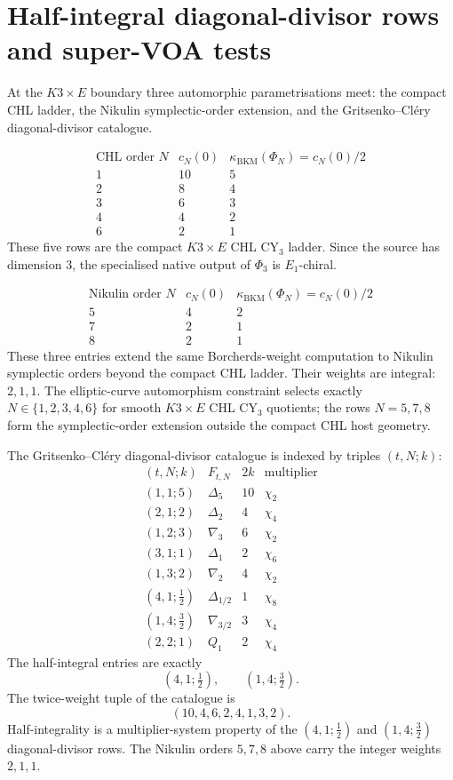 \providecommand{\kBKM}{\kappa_{\mathrm{BKM}}}
\providecommand{\kcat}{\kappa_{\mathrm{cat}}}
\providecommand{\kch}{\kappa_{\mathrm{ch}}}
\providecommand{\kfib}{\kappa_{\mathrm{fiber}}}
\providecommand{\Mp}{\mathrm{Mp}}
\providecommand{\Sp}{\mathrm{Sp}}

\section*{Half-integral diagonal-divisor rows and super-VOA tests}

At the \(K3\times E\) boundary three automorphic parametrisations meet:
the compact CHL ladder, the Nikulin symplectic-order extension, and the
Gritsenko--Cl\'ery diagonal-divisor catalogue.

\[
\begin{array}{c|c|c}
\text{CHL order }N & c_N(0) & \kBKM(\Phi_N)=c_N(0)/2 \\
\hline
1&10&5\\
2&8&4\\
3&6&3\\
4&4&2\\
6&2&1
\end{array}
\]
These five rows are the compact \(K3\times E\) CHL CY\(_3\) ladder.
Since the source has dimension \(3\), the specialised native output of
\(\Phi_3\) is \(E_1\)-chiral.

\[
\begin{array}{c|c|c}
\text{Nikulin order }N & c_N(0) & \kBKM(\Phi_N)=c_N(0)/2 \\
\hline
5&4&2\\
7&2&1\\
8&2&1
\end{array}
\]
These three entries extend the same Borcherds-weight computation to
Nikulin symplectic orders beyond the compact CHL ladder.  Their weights
are integral: \(2,1,1\).  The elliptic-curve automorphism constraint
selects exactly \(N\in\{1,2,3,4,6\}\) for smooth \(K3\times E\) CHL
CY\(_3\) quotients; the rows \(N=5,7,8\) form the symplectic-order
extension outside the compact CHL host geometry.

The Gritsenko--Cl\'ery diagonal-divisor catalogue is indexed by triples
\((t,N;k)\):
\[
\begin{array}{c|c|c|c}
(t,N;k) & F_{t,N} & 2k & \text{multiplier}\\
\hline
(1,1;5)&\Delta_5&10&\chi_2\\
(2,1;2)&\Delta_2&4&\chi_4\\
(1,2;3)&\nabla_3&6&\chi_2\\
(3,1;1)&\Delta_1&2&\chi_6\\
(1,3;2)&\nabla_2&4&\chi_2\\
(4,1;\tfrac12)&\Delta_{1/2}&1&\chi_8\\
(1,4;\tfrac32)&\nabla_{3/2}&3&\chi_4\\
(2,2;1)&Q_1&2&\chi_4
\end{array}
\]
The half-integral entries are exactly
\[
  (4,1;\tfrac12),\qquad (1,4;\tfrac32).
\]
The twice-weight tuple of the catalogue is
\[
  (10,4,6,2,4,1,3,2).
\]
Half-integrality is a multiplier-system property of the
\((4,1;\tfrac12)\) and \((1,4;\tfrac32)\) diagonal-divisor rows.  The
Nikulin orders \(5,7,8\) above carry the integer weights \(2,1,1\).

